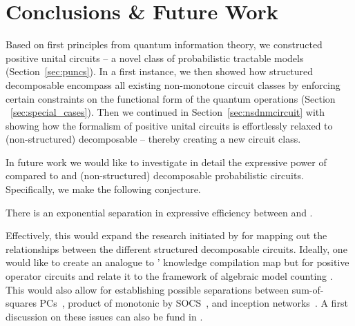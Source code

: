 \section{Conclusions \& Future Work}
\label{sec:conclusions}

Based on first principles from quantum information theory, we constructed positive unital circuits -- a novel class of probabilistic tractable models (Section~\ref{sec:puncs}).
In a first instance, we then showed how structured decomposable \puncs encompass all existing non-monotone circuit classes by enforcing certain constraints on the functional form of the quantum operations (Section ~\ref{sec:special_cases}).
Then we continued in Section~\ref{sec:nsdnmcircuit} with showing how the formalism of
positive unital circuits is effortlessly relaxed to (non-structured) decomposable \puncs -- thereby creating a new circuit class.

In future work we would like to investigate in detail the expressive power of \dpuncs compared to \sdpuncs and (non-structured) decomposable probabilistic circuits. Specifically, we make the following conjecture.

\begin{conjecture}
	There is an exponential separation in expressive efficiency between \dpuncs and \sdpuncs.
\end{conjecture}

Effectively, this would expand the research initiated by \citet{loconte2024subtractive} for mapping out the relationships between the different structured decomposable circuits. Ideally, one would like to create an analogue to \citeauthor{darwiche2002knowledge}' knowledge compilation map \citep{darwiche2002knowledge} but for positive operator circuits and relate it to the framework of algebraic model counting \citep{kimmig2017algebraic}.
This would also allow for establishing possible separations between sum-of-squares PCs~\citep{loconte2024subtractive}, product of monotonic by SOCS~\citep[Definition 5]{loconte2024subtractive}, and inception networks~\citep{wangrelationship}.
A first discussion on these issues can also be fund in \citep[Appendix A]{wangrelationship}.




